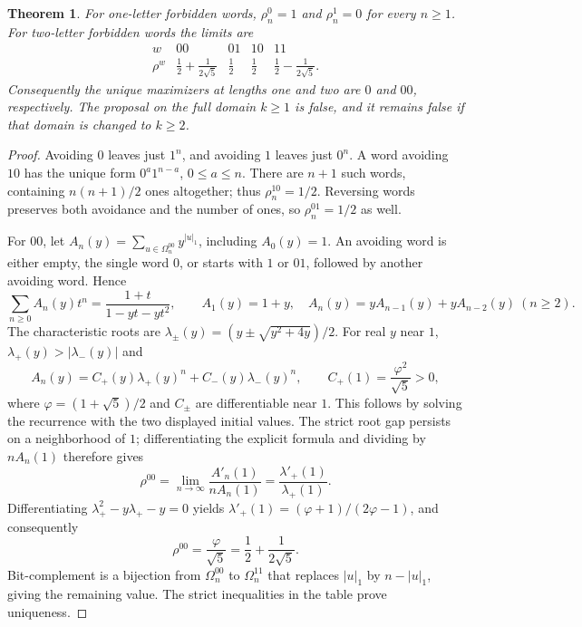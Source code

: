 \documentclass[11pt]{article}
\newtheorem{theorem}{Theorem}
\newcommand{\Om}{\Omega}
\begin{document}
\begin{theorem}\label{thm:boundary}
For one-letter forbidden words,
$\rho_n^0=1$ and $\rho_n^1=0$ for every $n\geq1$.
For two-letter forbidden words the limits are
\[
\begin{array}{c|cccc}
 w&00&01&10&11\\ \hline
 \rho^w&\displaystyle\frac12+\frac{1}{2\sqrt5}
 &\displaystyle\frac12&\displaystyle\frac12
 &\displaystyle\frac12-\frac{1}{2\sqrt5}.
\end{array}
\]
Consequently the unique maximizers at lengths one and two are $0$ and $00$,
respectively. The proposal on the full domain $k\geq1$ is false, and it
remains false if that domain is changed to $k\geq2$.
\end{theorem}

\begin{proof}
Avoiding $0$ leaves just $1^n$, and avoiding $1$ leaves just $0^n$.
A word avoiding $10$ has the unique form $0^a1^{n-a}$, $0\leq a\leq n$.
There are $n+1$ such words, containing $n(n+1)/2$ ones altogether;
thus $\rho_n^{10}=1/2$. Reversing words preserves both avoidance and the
number of ones, so $\rho_n^{01}=1/2$ as well.

For $00$, let $A_n(y)=\sum_{u\in\Om_n^{00}}y^{|u|_1}$, including
$A_0(y)=1$. An avoiding word is either empty, the single word $0$, or
starts with $1$ or $01$, followed by another avoiding word. Hence
\[
 \sum_{n\geq0}A_n(y)t^n=\frac{1+t}{1-yt-yt^2},\qquad
 A_1(y)=1+y,\quad A_n(y)=yA_{n-1}(y)+yA_{n-2}(y)\ (n\geq2).
\]
The characteristic roots are
$\lambda_\pm(y)=(y\pm\sqrt{y^2+4y})/2$.
For real $y$ near $1$, $\lambda_+(y)>|\lambda_-(y)|$ and
\[
 A_n(y)=C_+(y)\lambda_+(y)^n+C_-(y)\lambda_-(y)^n,
 \qquad C_+(1)=\frac{\varphi^2}{\sqrt5}>0,
\]
where $\varphi=(1+\sqrt5)/2$ and $C_\pm$ are differentiable near $1$.
This follows by solving the recurrence with the two displayed initial values.
The strict root gap persists on a neighborhood of $1$; differentiating
the explicit formula and dividing by $nA_n(1)$ therefore gives
\[
 \rho^{00}=\lim_{n\to\infty}\frac{A'_n(1)}{nA_n(1)}
 =\frac{\lambda'_+(1)}{\lambda_+(1)}.
\]
Differentiating $\lambda_+^2-y\lambda_+-y=0$ yields
$\lambda'_+(1)=(\varphi+1)/(2\varphi-1)$, and consequently
\[
 \rho^{00}=\frac{\varphi}{\sqrt5}
 =\frac12+\frac{1}{2\sqrt5}.
\]
Bit-complement is a bijection from $\Om_n^{00}$ to $\Om_n^{11}$ that
replaces $|u|_1$ by $n-|u|_1$, giving the remaining value.
The strict inequalities in the table prove uniqueness.
\end{proof}
\end{document}
